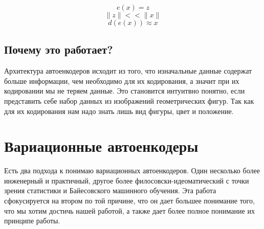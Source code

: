 \documentclass{article}
\begin{document}
$$e(x) = z$$
$$\lVert z \rVert << \lVert x \rVert $$
$$d(e(x)) \approx x$$

\subsection{Почему это работает?}
Архитектура автоенкодеров исходит из того, что изначальные данные содержат больше информации, чем необходимо для их кодирования, а значит при
их кодировании мы не теряем данные. Это становится интуитвно понятно, если представить себе набор данных из изображений геометрических фигур.
Так как для их кодирования нам надо знать лишь вид фигуры, цвет и положение.


\section{Вариационные автоенкодеры}
Есть два подхода к понимаю вариационных автоенкодеров. Один несколько более инженерный и практичный, другое более филосовски-идеоматический
с точки зрения статистики и Байесовского машинного обучения. Эта работа сфокусируется на втором по той причине, что он дает большее понимание того,
что мы хотим достичь нашей работой, а также дает более полное понимание их принципе работы.
\end{document}
